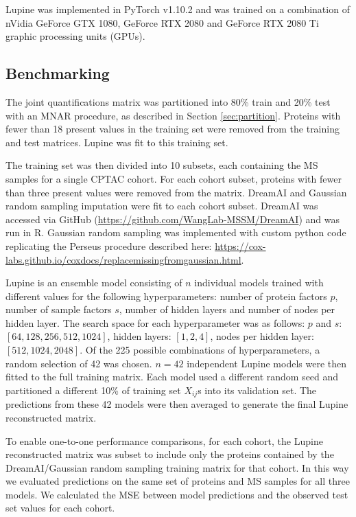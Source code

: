 \documentclass{article}
\begin{document}
Lupine was implemented in PyTorch v1.10.2 and was trained on a combination of nVidia GeForce GTX 1080, GeForce RTX 2080 and GeForce RTX 2080 Ti graphic processing units (GPUs). 

\subsection{Benchmarking}
\label{sec:benchmarking}

The joint quantifications matrix was partitioned into 80\% train and 20\% test with an MNAR procedure, as described in Section \ref{sec:partition}. Proteins with fewer than 18 present values in the training set were removed from the training and test matrices. Lupine was fit to this training set.

The training set was then divided into 10 subsets, each containing the MS samples for a single CPTAC cohort. For each cohort subset, proteins with fewer than three present values were removed from the matrix. DreamAI and Gaussian random sampling imputation were fit to each cohort subset. DreamAI was accessed via GitHub (\url{https://github.com/WangLab-MSSM/DreamAI}) and was run in R. Gaussian random sampling was implemented with custom python code replicating the Perseus procedure described here: \url{https://cox-labs.github.io/coxdocs/replacemissingfromgaussian.html}.

Lupine is an ensemble model consisting of $n$ individual models trained with different values for the following hyperparameters: number of protein factors $p$, number of sample factors $s$, number of hidden layers and number of nodes per hidden layer. The search space for each hyperparameter was as follows: $p$ and $s$: $[64,128,256,512,1024]$, hidden layers: $[1,2,4]$, nodes per hidden layer: $[512,1024,2048]$. Of the 225 possible combinations of hyperparameters, a random selection of 42 was chosen. $n=42$ independent Lupine models were then fitted to the full training matrix. Each model used a different random seed and partitioned a different 10\% of training set $X_{ij}$s into its validation set. The predictions from these 42 models were then averaged to generate the final Lupine reconstructed matrix.

To enable one-to-one performance comparisons, for each cohort, the Lupine reconstructed matrix was subset to include only the proteins contained by the DreamAI/Gaussian random sampling training matrix for that cohort. In this way we evaluated predictions on the same set of proteins and MS samples for all three models. We calculated the MSE between model predictions and the observed test set values for each cohort. 
\end{document}

